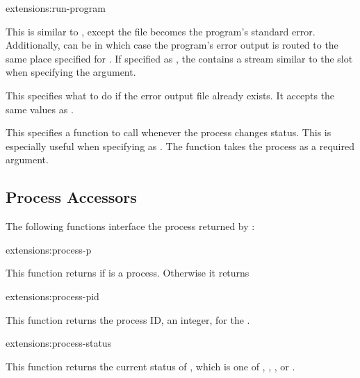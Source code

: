 \begin{defun}{extensions:}{run-program}
\begin{Lentry}
  \item[\kwd{error}] This is similar to , except the file
    becomes the program's standard error.  Additionally, 
    can be  in which case the program's error output is
    routed to the same place specified for .  If specified
    as , the  contains a stream
    similar to the  slot when specifying the
     argument.
    
  \item[\kwd{if-error-exists}] This specifies what to do if the error
    output file already exists.  It accepts the same values as
    .
    
  \item[\kwd{status-hook}] This specifies a function to call whenever
    the process changes status.  This is especially useful when
    specifying  as \nil.  The function takes the process as
    a required argument.
    
  \end{Lentry}
\end{defun}


\subsection{Process Accessors}

The following functions interface the process returned by :

\begin{defun}{extensions:}{process-p}{}
  
  This function returns \true{} if  is a process.
  Otherwise it returns \nil{}
\end{defun}

\begin{defun}{extensions:}{process-pid}{}
  
  This function returns the process ID, an integer, for the
  .
\end{defun}

\begin{defun}{extensions:}{process-status}{}
  
  This function returns the current status of , which is
  one of , , , or
  .
\end{defun}

